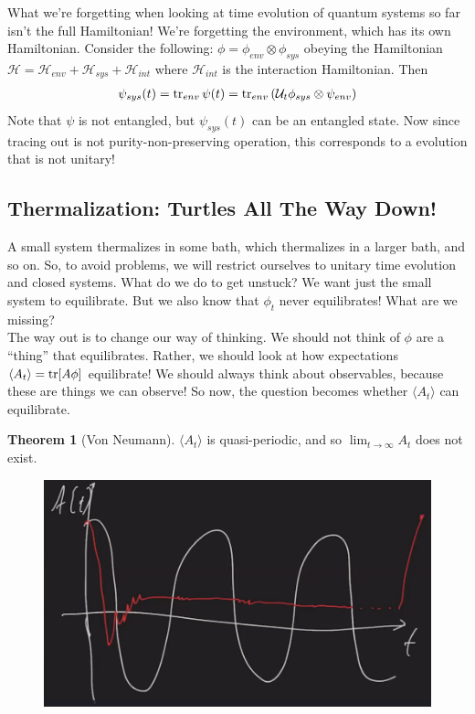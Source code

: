 \documentclass{book}
\theoremstyle{definition}
\newtheorem{thm}{Theorem}[section]
\newcommand{\had}{\mathcal{H}}
\newcommand{\lp}{\left(}
\newcommand{\rp}{\right)}
\newcommand{\U}{\mathcal{U}}
\begin{document}
What we're forgetting when looking at time evolution of quantum systems so far isn't the full Hamiltonian! We're forgetting the environment, which has its own Hamiltonian. Consider the following: $\phi = \phi_{env}\otimes \phi_{sys}$ obeying the Hamiltonian $\had = \had_{env} + \had_{sys} + \had_{int}$ where $\had_{int}$ is the interaction Hamiltonian. Then 
\begin{align}
\psi_{sys}(t) = \tr_{env}\psi(t) = \tr_{env}\lp \U_t \phi_{sys} \otimes \psi_{env} \rp
\end{align}
Note that $\psi$ is not entangled, but $\psi_{sys}(t)$ can be an entangled state. Now since tracing out is not purity-non-preserving operation, this corresponds to a evolution that is not unitary!  


\subsection{Thermalization: Turtles All The Way Down!}

A small system thermalizes in some bath, which thermalizes in a larger bath, and so on. So, to avoid problems, we will restrict ourselves to unitary time evolution and closed systems. What do we do to get unstuck? We want just the small system to equilibrate. But we also know that $\phi_t$ never equilibrates! What are we missing?\\

The way out is to change our way of thinking. We should not think of $\phi$ are a ``thing'' that equilibrates. Rather, we should look at how expectations $\langle A_t\rangle = \tr[A \phi]$ equilibrate! We should always think about observables, because these are things we can observe! So now, the question becomes whether $\langle A_t\rangle$ can equilibrate.  

\begin{thm}[Von Neumann]
	$\langle A_t\rangle$ is quasi-periodic, and so $\lim_{t\to\infty} A_t$ does not exist.  
\end{thm}

\begin{figure}[!htb]
	\centering
	\includegraphics[scale=0.3]{quasi}
\end{figure}
\end{document}
